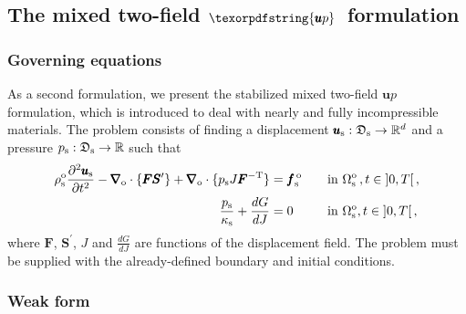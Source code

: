 \documentclass[11pt,english]{article}
\def\usolid{\pmb{u}_{\rm{s}}}                   %
\def\psolid{p_{\rm{s}}}                         %
\def\devPK{\pmb{S}^\prime}                      %
\def\F{\pmb{F}}                             %
\def\invFtrans{\pmb{F}^{-\rm{T}}}           %
\def\dGdJ{\frac{dG}{dJ}}                    %
\def\domainsolidreference{\Omega_{\rm{s}}^{\rm{o}}}  %
\def\bodyfsolid{\pmb{f}_{\rm{s}}^{\,\rm{o}}}        %
\def\grad{\pmb{\nabla}_{\rm{o}}}        %
\def\div{\grad \cdot}                   %
\def\denssolid{\rho_{\rm{s}}^{\rm{o}}}  %
\def\kappasolid{\kappa_{\rm{s}}}        %
\def\up{\pmb{u} p}
\def\timeint{\left ] 0,T\right[}                         %
\def\dudt{\frac{\partial \usolid}{\partial t}}          %
\def\dudt2{\frac{\partial^2 \usolid}{\partial t^2}}     %
\begin{document}
\subsection{The mixed two-field $\texorpdfstring{\up}~$ formulation\label{subsec:up_formulation}}

\subsubsection{Governing equations\label{subsubsec:up_formulation_governing}}
As a second formulation, we present the stabilized mixed two-field $\up$ formulation, which is introduced to deal with nearly and fully incompressible materials. The problem consists of finding a displacement $\usolid:\mathfrak{D}_{\mathrm{s}} \to \mathbb{R}^d$ and a pressure $\psolid:\mathfrak{D}_{\mathrm{s}} \to \mathbb{R}$ such that
\begin{align}
\denssolid \dudt2 - \div \lbrace \F \devPK \rbrace + \div \lbrace \psolid J \invFtrans \rbrace &= \bodyfsolid \quad && \hbox{in}~\domainsolidreference\,, t \in \timeint, \label{eq:sol_conservation_linear_momentum_up} \\
 \frac{\psolid}{\kappasolid} + \dGdJ &= 0 \quad && \hbox{in}~\domainsolidreference, t \in \timeint, \label{eq:sol_constitutive_volumetric_law_up}
 \end{align}
where $\F$, $\devPK$, $J$ and $\dGdJ$ are functions of the displacement field. The problem must be supplied with the already-defined boundary and initial conditions.

\subsubsection{Weak form\label{subsubsec:up_formulation_weakform}}
\end{document}
